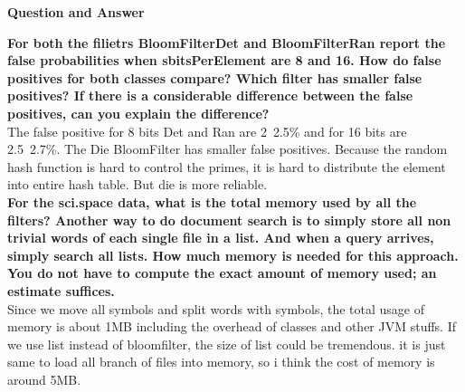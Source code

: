 \documentclass[a4paper,14pt]{article}
\begin{document}
\begin{center}
\textbf{{\large Question and Answer}}
\end{center}
\textbf{For both the filietrs BloomFilterDet and BloomFilterRan report the false probabilities when sbitsPerElement are 8 and 16. How do false positives for both classes compare? Which filter has smaller false positives? If there is a considerable difference between the false positives, can you explain the difference?}
\\[6pt]
The false positive for 8 bits Det and Ran are 2~2.5\% and for 16 bits are 2.5~2.7\%. The Die BloomFilter has smaller false positives. Because the random hash function is hard to control the primes, it is hard to distribute the element into entire hash table. But die is more reliable.
\\[6pt]
\textbf{For the sci.space data, what is the total memory used by all the filters? Another way to do document search is to simply store all non trivial words of each single file in a list. And when a query arrives, simply search all lists. How much memory is needed for this approach. You do not have to compute the exact amount of memory used; an estimate suffices.}
\\[6pt]
Since we move all symbols and split words with symbols, the total usage of memory is about 1MB including the overhead of classes and other JVM stuffs. If we use list instead of bloomfilter, the size of list could be tremendous. it is just same to load all branch of files into memory, so i think the cost of memory is around 5MB.
\end{document}

